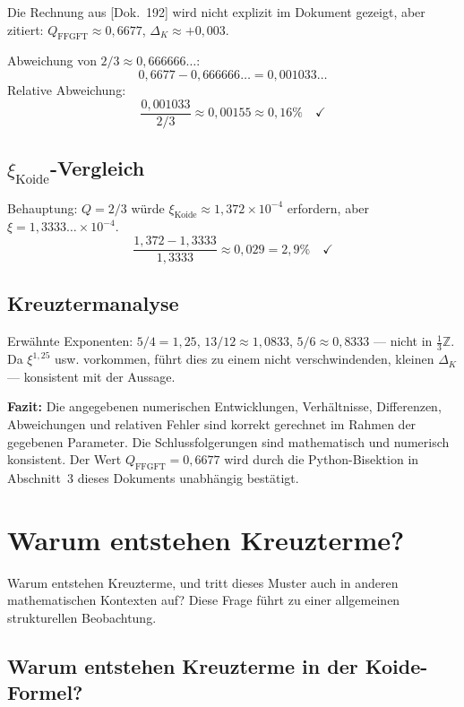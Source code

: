 Die Rechnung aus [Dok.~192] wird nicht explizit im Dokument gezeigt, aber zitiert:
$Q_{\text{FFGFT}}\approx0{,}6677$, $\Delta_K\approx+0{,}003$.

Abweichung von $2/3\approx0{,}666666\ldots$:
\[
  0{,}6677-0{,}666666\ldots=0{,}001033\ldots
\]
Relative Abweichung:
\[
  \frac{0{,}001033}{2/3}\approx0{,}00155\approx0{,}16\%\quad\checkmark
\]

\subsection{$\xi_{\text{Koide}}$-Vergleich}

Behauptung: $Q=2/3$ würde $\xi_{\text{Koide}}\approx1{,}372\times10^{-4}$ erfordern,
aber $\xi=1{,}3333\ldots\times10^{-4}$.
\[
  \frac{1{,}372-1{,}3333}{1{,}3333}\approx0{,}029=2{,}9\%\quad\checkmark
\]

\subsection{Kreuztermanalyse}

Erwähnte Exponenten: $5/4=1{,}25$, $13/12\approx1{,}0833$, $5/6\approx0{,}8333$
— nicht in $\tfrac{1}{3}\mathbb{Z}$.
Da $\xi^{1{,}25}$ usw. vorkommen, führt dies zu einem nicht verschwindenden,
kleinen $\Delta_K$ — konsistent mit der Aussage.

\medskip\noindent
\textbf{Fazit:} Die angegebenen numerischen Entwicklungen, Verhältnisse,
Differenzen, Abweichungen und relativen Fehler sind korrekt gerechnet
im Rahmen der gegebenen Parameter.
Die Schlussfolgerungen sind mathematisch und numerisch konsistent.
Der Wert $Q_{\text{FFGFT}}=0{,}6677$ wird durch die Python-Bisektion
in Abschnitt~3 dieses Dokuments unabhängig bestätigt.

\section{Warum entstehen Kreuzterme?}

Warum entstehen Kreuzterme, und tritt dieses Muster auch in anderen mathematischen
Kontexten auf? Diese Frage führt zu einer allgemeinen strukturellen Beobachtung.

\subsection{Warum entstehen Kreuzterme in der Koide-Formel?}

